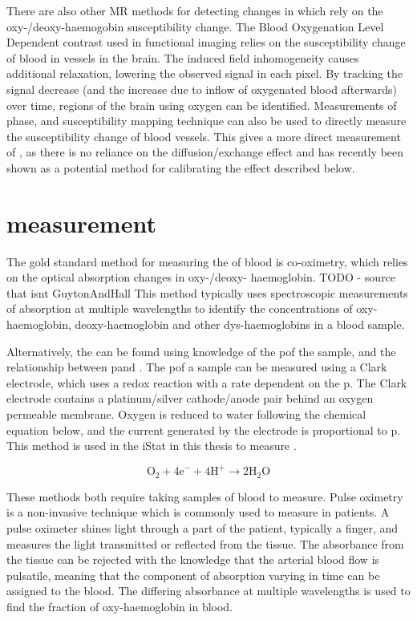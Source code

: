 There are also other MR methods for detecting changes in \SOtwo which rely on the oxy-/deoxy-haemogobin susceptibility change.
The Blood Oxygenation Level Dependent contrast used in functional imaging relies on the susceptibility change of blood in vessels in the brain.
The induced field inhomogeneity causes additional \Ttwostar relaxation, lowering the observed signal in each pixel.
By tracking the signal decrease (and the increase due to inflow of oxygenated blood afterwards) over time, regions of the brain using oxygen can be identified.
Measurements of phase, and susceptibility mapping technique can also be used to directly measure the susceptibility change of blood vessels\cite{Haackevivomeasurementblood1997,Fernandez-SearaMRsusceptometrymeasuring2006a,JainInvestigatingmagneticsusceptibility2012}.
This gives a more direct measurement of \SOtwo, as there is no reliance on the diffusion/exchange effect and has recently been shown as a potential method for calibrating the \Ttwo effect described below.\cite{LanghamvivowholebloodT22018}

\section{\SOtwo measurement}
The gold standard method for measuring the \SOtwo of blood is co-oximetry, which relies on the optical absorption changes in oxy-/deoxy- haemoglobin. TODO - source that isnt GuytonAndHall
This method typically uses spectroscopic measurements of absorption at multiple wavelengths to identify the concentrations of oxy-haemoglobin, deoxy-haemoglobin and other dys-haemoglobins in a blood sample.

Alternatively, the \SOtwo can be found using knowledge of the p\Otwo of the sample, and the relationship between p\Otwo and \SOtwo.
The p\Otwo of a sample can be measured using a Clark electrode, which uses a redox reaction with a rate dependent on the p\Otwo.
The Clark electrode contains a platinum/silver cathode/anode pair behind an oxygen permeable membrane.
Oxygen is reduced to water following the chemical equation below, and the current generated by the electrode is proportional to p\Otwo.
This method is used in the iStat in this thesis to measure \SOtwo.

\begin{equation}
\mathrm{O}_2 + \mathrm{4e}^- + \mathrm{4 H}^+ \rightarrow \mathrm{2H}_2\mathrm{O}
\label{eq:ClarkO2}
\end{equation}

These methods both require taking samples of blood to measure.
Pulse oximetry is a non-invasive technique which is commonly used to measure \SOtwo in patients.
A pulse oximeter shines light through a part of the patient, typically a finger, and measures the light transmitted or reflected from the tissue.
The absorbance from the tissue can be rejected with the knowledge that the arterial blood flow is pulsatile, meaning that the component of absorption varying in time can be assigned to the blood. \cite{WiebenLightAbsorbancePulse1997}
The differing absorbance at multiple wavelengths is used to find the fraction of oxy-haemoglobin in blood.

